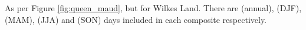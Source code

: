 \label{fig:wilkes}
As per Figure \ref{fig:queen_maud}, but for Wilkes Land. There are (annual),  (DJF),  (MAM),  (JJA) and  (SON) days included in each composite respectively.